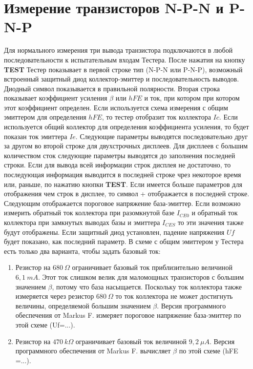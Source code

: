 \section{Измерение транзисторов N-P-N и P-N-P}
Для нормального измерения три вывода транзистора подключаются в любой последовательности к испытательным входам 
Тестера. После нажатия на кнопку \textbf{ TEST} Тестер показывает в первой строке тип (N-P-N или P-N-P), возможный 
встроенный защитный диод коллектор-эмиттер и последовательность выводов. Диодный символ показывается в правильной 
полярности.
Вторая строка показывает коэффициент усиления \(\beta\) или \(hFE\) и ток, при котором при котором 
этот коэффициент определен. Если используется схема измерения с общим эмиттером для определения \(hFE\),
то тестер отобразит ток коллектора \(Ic\). Если используется общий коллектор для определения коэффициента
усиления, то будет показан ток эмиттера \(Ie\).
Следующие параметры выводятся последовательно друг за другом во второй строке для двухстрочных дисплеев. 
Для дисплеев с большим количеством сток следующие параметры выводятся до заполнения последней строки.
Если для вывода всей информации строк дисплея не достаточно, то последующая информация выводится в последней 
строке чрез некоторое время или, раньше, по нажатию кнопки \textbf{ TEST}.
Если имеется больше параметров для отображения чем строк в дисплее, то символ + отображается в последней строке.  
Следующим отображается пороговое напряжение база-эмиттер. 
Если возможно измерить обратный ток коллектора при разомкнутой базе \(I_{CE0}\) и
обратный ток коллектора при замкнутых выводах базы и эмиттера \(I_{CES}\) то эти значения также будут отображены. 
Если защитный диод установлен, падение напряжения \(Uf\) будет показано, как последний параметр.
В схеме с общим эмиттером у Тестера есть только два варианта, чтобы задать базовый ток:
\begin{enumerate}
\item Резистор на \(680~\Omega\) ограничивает базовый ток приблизительно величиной \(6,1~mA\). Этот ток слишком 
велик для маломощных транзисторов с большим значением \(\beta\), потому что база насыщается. Поскольку ток коллектора 
также измеряется через резистор \(680~\Omega\) то ток коллектора не может достигнуть  величины, определяемой большим 
значением \(\beta\). Версия программного обеспечения от Markus F. измеряет пороговое напряжение база-эмиттер по этой 
схеме  (Uf=...).\\
\item Резистор на \(470~k\Omega\) ограничивает базовый ток величиной \(9,2~\mu A\).
Версия программного обеспечения от Markus F. вычисляет \(\beta\) по этой схеме (hFE =...).\\
\end{enumerate}

